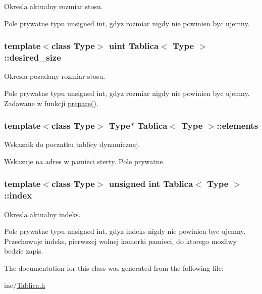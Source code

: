 Okresla aktualny rozmiar stosu. 

Pole prywatne typu unsigned int, gdyz rozmiar nigdy nie powinien byc ujemny. \hypertarget{class_tablica_ab9bd8738c20ec1d02ceff156af4675bc}{
\subsubsection[{desired\-\_\-size}]{\setlength{\rightskip}{0pt plus 5cm}template$<$class Type$>$ {\bf uint} {\bf Tablica}$<$ Type $>$\-::desired\-\_\-size\hspace{0.3cm}{\ttfamily [private]}}}\label{class_tablica_ab9bd8738c20ec1d02ceff156af4675bc}


Okresla pozadany rozmiar stosu. 

Pole prywatne typu unsigned int, gdyz rozmiar nigdy nie powinien byc ujemny. Zadawane w funkcji \hyperlink{class_tablica_ac54e8c5dcbd665dcf48d10b9df8ff41b}{prepare()}. \hypertarget{class_tablica_a03f7862b518bdd503051388389949257}{
\subsubsection[{elements}]{\setlength{\rightskip}{0pt plus 5cm}template$<$class Type$>$ Type$\ast$ {\bf Tablica}$<$ Type $>$\-::elements\hspace{0.3cm}{\ttfamily [private]}}}\label{class_tablica_a03f7862b518bdd503051388389949257}


Wskaznik do poczatku tablicy dynamicznej. 

Wskazuje na adres w pamieci sterty. Pole prywatne. \hypertarget{class_tablica_ab05112ff73217668c456d7a92273574e}{
\subsubsection[{index}]{\setlength{\rightskip}{0pt plus 5cm}template$<$class Type$>$ unsigned int {\bf Tablica}$<$ Type $>$\-::index\hspace{0.3cm}{\ttfamily [private]}}}\label{class_tablica_ab05112ff73217668c456d7a92273574e}


Okresla aktualny indeks. 

Pole prywatne typu unsigned int, gdyz indeks nigdy nie powinien byc ujemny. Przechowuje indeks, pierwszej wolnej komorki pamieci, do ktorego mozliwy bedzie zapis. 

The documentation for this class was generated from the following file\-:\begin{DoxyCompactItemize}
\item 
inc/\hyperlink{_tablica_8h}{Tablica.\-h}\end{DoxyCompactItemize}
